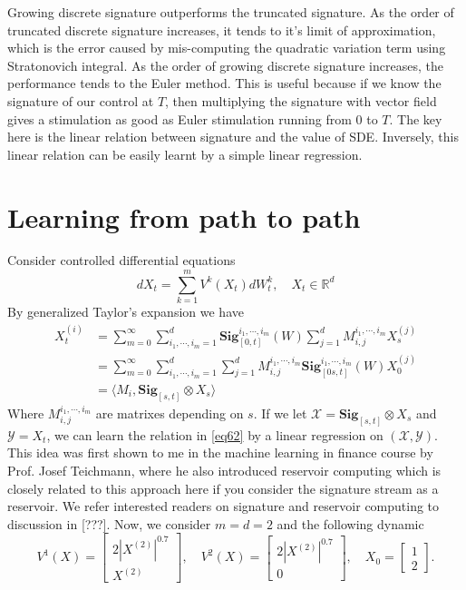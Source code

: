 \documentclass[12pt]{report}
\theoremstyle{definition}
\theoremstyle{remark}
\newcommand{\R}{\mathbb{R}}
\begin{document}
Growing discrete signature outperforms the truncated signature. As the order of truncated discrete signature increases, it tends to it's limit of approximation, which is the error caused by mis-computing the quadratic variation term using Stratonovich integral. As the order of growing discrete signature increases, the performance tends to the Euler method. This is useful because if we know the signature of our control at $T$, then multiplying the signature with vector field gives a stimulation as good as Euler stimulation running from $0$ to $T$. The key here is the linear relation between signature and the value of SDE. Inversely, this linear relation can be easily learnt by a simple linear regression.

\section{Learning from path to path}
Consider controlled differential equations 
\begin{equation}
  dX_{t} = \sum_{k=1}^{m}V^{k}(X_{t})dW^{k}_{t},\quad X_{t}\in\R^{d}
\end{equation}
By generalized Taylor's expansion we have 
\begin{equation}\label{eq62}
    \begin{split}
        X^{(i)}_{t} &= \sum_{m=0}^{\infty}\sum_{i_{1},\cdots,i_{m} = 1}^{d}\mathbf{Sig}_{[0,t]}^{i_{1},\cdots,i_{m}}(W)\sum_{j=1}^{d}M^{i_{1},\cdots,i_{m}}_{i,j}X^{(j)}_{s}\\
        &= \sum_{m=0}^{\infty}\sum_{i_{1},\cdots,i_{m} = 1}^{d}\sum_{j=1}^{d}M^{i_{1},\cdots,i_{m}}_{i,j} \mathbf{Sig}_{[0s,t]}^{i_{1},\cdots,i_{m}}(W) X^{(j)}_{0}\\
        &= \langle M_{i} ,  \mathbf{Sig}_{[s,t]} \otimes X_{s} \rangle
    \end{split}
\end{equation}
Where $M^{i_{1},\cdots,i_{m}}_{i,j}$ are matrixes depending on $s$. If we let $\mathcal{X} = \mathbf{Sig}_{[s,t]} \otimes X_{s}$ and $\mathcal{Y} = X_{t}$, we can learn the relation in \eqref{eq62} by a linear regression on $(\mathcal{X},\mathcal{Y})$. This idea was first shown to me in the machine learning in finance course by Prof. Josef Teichmann, where he also introduced reservoir computing which is closely related to this approach here if you consider the signature stream as a reservoir. We refer interested readers on signature and reservoir computing to discussion in [???]. Now, we consider $m = d = 2$ and the following dynamic
\begin{equation*}
  V^{1}(X) = \begin{bmatrix}
    2|X^{(2)}|^{0.7}\\
    X^{(2)}
  \end{bmatrix},\quad 
  V^{2}(X) = \begin{bmatrix}
    2|X^{(2)}|^{0.7}\\
    0
  \end{bmatrix},\quad 
  X_{0} = \begin{bmatrix}
    1\\
    2
  \end{bmatrix}.
\end{equation*}
\end{document}
